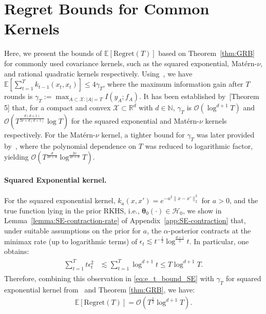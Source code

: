 \documentclass[final,12pt]{colt2026} %
\begin{document}

\section{Regret Bounds for Common Kernels}\label{subsec:bound-common-kernels}
Here, we present the bounds of $\mathbb{E}[\mathrm{Regret}(T)]$ based on Theorem~\ref{thm:GRB} for commonly used covariance kernels, such as the squared exponential, Mat\'{e}rn-$\nu$, and rational quadratic kernels respectively.
Using~\cite{chowdhury2021reinforcement}, we have $\mathbb{E}\left[\sum_{t=1}^{T}k_{t-1}(x_t, x_t)\right] \leq 4\gamma_T$, where the maximum information gain after $T$ rounds is $\gamma_T := \max_{A\subset \mathcal{X}:|A|=T}I(y_A; f_A)$.
It has been established by~\cite{srinivas2010gaussian}[Theorem 5] that, for a compact and convex $\mathcal{X}\subset \mathbb{R}^{d}$ with $d\in \mathbb{N}$, $\gamma_T$ is $\mathcal{O}(\log^{d+1} T)$ and $\mathcal{O}(T^{\frac{d(d+1)}{2\nu+d(d+1)}}\log T)$ for the squared exponential and Mat\'{e}rn-$\nu$ kernels respectively. For the Mat\'{e}rn-$\nu$ kernel, a tighter bound for $\gamma_T$ was later provided by~\cite{vakili21a}, where the polynomial dependence on $T$ was reduced to logarithmic factor, yielding $\mathcal{O}(T^{\frac{d}{2\nu+d}}\log^{\frac{2\nu}{2\nu+d}} T)$. 

\paragraph{Squared Exponential kernel.} For the squared exponential kernel, $k_a(x, x') = e^{-a^2\lVert x-x'\rVert^2_2}$ for $a>0$, and the true function lying in the prior RKHS, i.e., $\pmb{\theta}_0(\cdot)  \in \mathcal{H}_0$, we show in Lemma~\ref{lemma:SE-contraction-rate} of Appendix~\ref{app:SE-contraction} that, under suitable assumptions on the prior for $a$, the $\alpha$-posterior contracts at the minimax rate (up to logarithmic terms) of $\epsilon_t \lesssim t^{-\frac{1}{2}}\log^{\frac{d+1}{2}} t$. In particular, one obtains:
\begin{align}\label{eq:e_t_bound_SE}
    \begin{split}
        \sum_{t=1}^{T}t\epsilon_t^{2} &\lesssim \sum_{t=1}^{T} \log^{d+1} t \leq T \log^{d+1}T.
    \end{split}
\end{align}
Therefore, combining this observation in \eqref{eq:e_t_bound_SE} with $\gamma_T$ for squared exponential kernel from~\cite{srinivas2010gaussian,vakili21a} and Theorem \ref{thm:GRB}, we have:
\begin{align}\label{eq:SE-RB}
    \mathbb{E}[\mathrm{Regret}(T)] = \mathcal{O}\left(T^{\frac{1}{2}} \log^{d+1} T\right).
\end{align}
\end{document}
